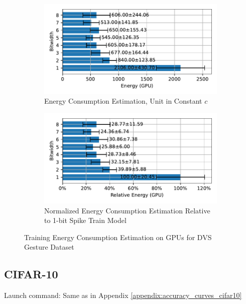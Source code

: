         \begin{figure}[H]
            \centering
            \begin{subfigure}[H]{0.6\textwidth}
                \includegraphics[width=\textwidth]{../standard/DVSGesture/plots/dvsgesture_train_energy_gpu_horizontal.pdf}
                \caption{Energy Consumption Estimation, Unit in Constant $c$}
            \end{subfigure}
            \hfill
            \begin{subfigure}[H]{0.6\textwidth}
                \includegraphics[width=\textwidth]{../standard/DVSGesture/plots/dvsgesture_train_relative_energy_gpu_horizontal.pdf}
                \caption{Normalized Energy Consumption Estimation Relative to 1-bit Spike Train Model}
            \end{subfigure}
            \caption{Training Energy Consumption Estimation on GPUs for DVS Gesture Dataset}
        \end{figure}

    \subsection{CIFAR-10}
    \label{appendix:energy_gpu_cifar10}
        Launch command: Same as in Appendix \ref{appendix:accuracy_curves_cifar10}

